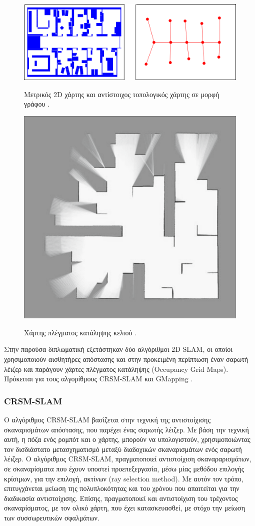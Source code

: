 \begin{figure}[!ht]
	\centering
	\includegraphics[width=0.7\linewidth]{Chapters/Chapter3/Figures/ogm_and_tm.png}
	\label{fig:ogm_and_tm}
	\caption[Μετρικός 2D χάρτης και αντίστοιχος τοπολογικός χάρτης σε μορφή γράφου.]{Μετρικός 2D χάρτης και αντίστοιχος τοπολογικός χάρτης σε μορφή γράφου \cite{probabilistic_robotics}.}
\end{figure}

\begin{figure}[!ht]
	\centering
	\includegraphics[width=0.4\linewidth]{Chapters/Chapter3/Figures/ogm.png}
	\label{fig:ogm}
	\caption[Χάρτης πλέγματος κατάληψης κελιού.]{Χάρτης πλέγματος κατάληψης κελιού \cite{crsm}.}
\end{figure}

\bigskip
Στην παρούσα διπλωματική εξετάστηκαν δύο αλγόριθμοι 2D SLAM, οι οποίοι χρησιμοποιούν αισθητήρες απόστασης και στην προκειμένη περίπτωση έναν {σαρωτή λέιζερ} και παράγουν χάρτες πλέγματος κατάληψης (Occupancy Grid Maps). Πρόκειται για τους αλγορίθμους CRSM-SLAM \cite{crsm} και GMapping \cite{gmapping}.

\bigskip
\subsubsection{CRSM-SLAM} \label{sssec:crsm_slam}
Ο αλγόριθμος CRSM-SLAM βασίζεται στην τεχνική της αντιστοίχισης σκαναρισμάτων απόστασης, που παρέχει ένας {σαρωτής λέιζερ}. Με βάση την τεχνική αυτή, η πόζα ενός ρομπότ και ο χάρτης, μπορούν να υπολογιστούν, χρησιμοποιώντας τον δισδιάστατο μετασχηματισμό μεταξύ διαδοχικών σκαναρισμάτων ενός σαρωτή λέιζερ. Ο αλγόριθμος CRSM-SLAM, πραγματοποιεί αντιστοίχιση σκαναραρισμάτων, σε σκαναρίσματα που έχουν υποστεί προεπεξεργασία, μέσω μίας μεθόδου επιλογής κρίσιμων, για την επιλογή, ακτίνων (ray selection method). Με αυτόν τον τρόπο, επιτυγχάνεται μείωση της πολυπλοκότητας και του χρόνου που απαιτείται για την διαδικασία αντιστοίχισης. Επίσης, πραγματοποιεί και αντιστοίχιση του τρέχοντος σκαναρίσματος, με τον ολικό χάρτη, που έχει κατασκευασθεί, με στόχο την μείωση των συσσωρευτικών σφαλμάτων.

